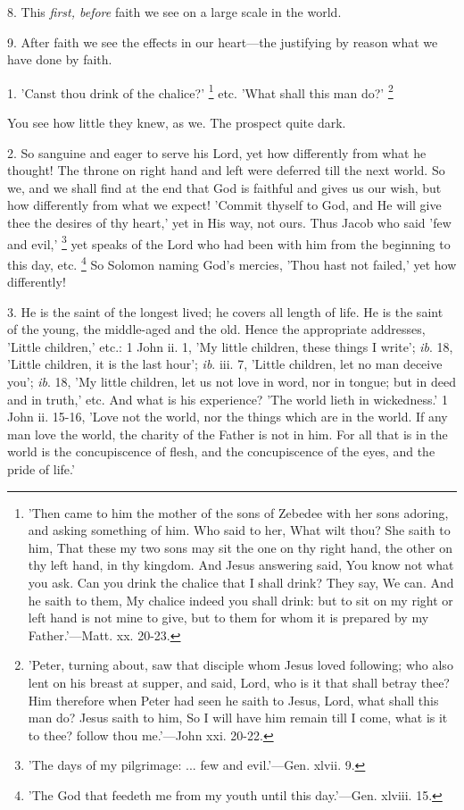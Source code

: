 8. This \emph{first, before} faith we see on a
large scale in the world.

9. After faith we see the effects in our
heart—the justifying by reason what we have done by faith.


1. 'Canst thou drink of the chalice?' \footnote{'Then came to him the
mother of the sons of Zebedee with her sons adoring, and asking
something of him. Who said to her, What wilt thou? She saith to him,
That these my two sons may sit the one on thy right hand, the other on
thy left hand, in thy kingdom. And Jesus answering said, You know not
what you ask. Can you drink the chalice that I shall drink? They say,
We can. And he saith to them, My chalice indeed you shall drink: but
to sit on my right or left hand is not mine to give, but to them for
whom it is prepared by my Father.'—Matt. xx. 20-23.} etc. 'What shall this man do?' \footnote{'Peter, turning about,
saw that disciple whom Jesus loved following; who also lent on his
breast at supper, and said, Lord, who is it that shall betray thee?
Him therefore when Peter had seen he saith to Jesus, Lord, what shall
this man do? Jesus saith to him, So I will have him remain till I
come, what is it to thee? follow thou me.'—John xxi. 20-22.}

You see how little they knew, as we. The prospect
quite dark.

2. So sanguine and eager to serve his Lord, yet
how differently from what he thought! The throne on right hand and
left were deferred till the next world. So we, and we shall find at
the end that God is faithful and gives us our wish, but how
differently from what we expect! 'Commit thyself to God, and He will
give thee the desires of thy heart,' yet in His way, not ours. Thus
Jacob who said 'few and evil,' \footnote{'The days of my
pilgrimage: ... few and evil.'—Gen. xlvii. 9.} yet speaks of the Lord who had been with him from the
beginning to this day, etc. \footnote{'The God that feedeth me
from my youth until this day.'—Gen. xlviii. 15.}
So Solomon naming God's mercies, 'Thou hast not failed,' yet how
differently!

3. He is the saint of the longest lived; he
covers all length of life. He is the saint of the young, the
middle-aged and the old. Hence the appropriate addresses, 'Little
children,' etc.: 1 John ii. 1, 'My little children, these things I
write'; \emph{ib}. 18, 'Little children, it is the last hour'; \emph{ib}.
iii. 7, 'Little children, let no man deceive you'; \emph{ib}. 18, 'My
little children, let us not love in word, nor in tongue; but in deed
and in truth,' etc. And what is his experience? 'The world lieth in
wickedness.' 1 John ii. 15-16, 'Love not the world, nor the things
which are in the world. If any man love the world, the charity of the
Father is not in him. For all that is in the world is the
concupiscence of flesh, and the concupiscence of the eyes, and the
pride of life.'

